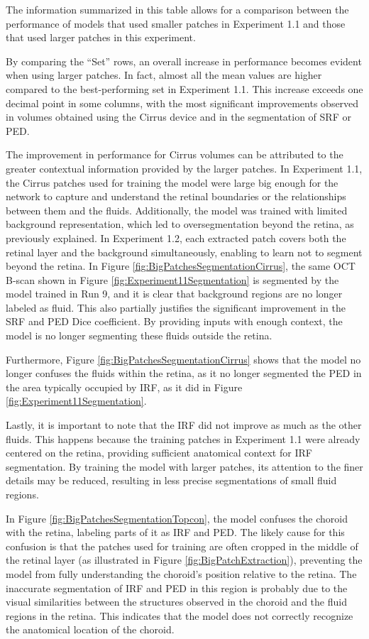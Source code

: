 The information summarized in this table allows for a comparison between the performance of models that used smaller patches in Experiment 1.1 and those that used larger patches in this experiment.
\par
By comparing the ``Set'' rows, an overall increase in performance becomes evident when using larger patches. In fact, almost all the mean values are higher compared to the best-performing set in Experiment 1.1. This increase exceeds one decimal point in some columns, with the most significant improvements observed in volumes obtained using the Cirrus device and in the segmentation of SRF or PED.
\par
The improvement in performance for Cirrus volumes can be attributed to the greater contextual information provided by the larger patches. In Experiment 1.1, the Cirrus patches used for training the model were large big enough for the network to capture and understand the retinal boundaries or the relationships between them and the fluids. Additionally, the model was trained with limited background representation, which led to oversegmentation beyond the retina, as previously explained. In Experiment 1.2, each extracted patch covers both the retinal layer and the background simultaneously, enabling to learn not to segment beyond the retina. In Figure \ref{fig:BigPatchesSegmentationCirrus}, the same OCT B-scan shown in Figure \ref{fig:Experiment11Segmentation} is segmented by the model trained in Run 9, and it is clear that background regions are no longer labeled as fluid. This also partially justifies the significant improvement in the SRF and PED Dice coefficient. By providing inputs with enough context, the model is no longer segmenting these fluids outside the retina. 
\par
Furthermore, Figure \ref{fig:BigPatchesSegmentationCirrus} shows that the model no longer confuses the fluids within the retina, as it no longer segmented the PED in the area typically occupied by IRF, as it did in Figure \ref{fig:Experiment11Segmentation}.
\par
Lastly, it is important to note that the IRF did not improve as much as the other fluids. This happens because the training patches in Experiment 1.1 were already centered on the retina, providing sufficient anatomical context for IRF segmentation. By training the model with larger patches, its attention to the finer details may be reduced, resulting in less precise segmentations of small fluid regions.
\par
In Figure \ref{fig:BigPatchesSegmentationTopcon}, the model confuses the choroid with the retina, labeling parts of it as IRF and PED. The likely cause for this confusion is that the patches used for training are often cropped in the middle of the retinal layer (as illustrated in Figure \ref{fig:BigPatchExtraction}), preventing the model from fully understanding the choroid's position relative to the retina. The inaccurate segmentation of IRF and PED in this region is probably due to the visual similarities between the structures observed in the choroid and the fluid regions in the retina. This indicates that the model does not correctly recognize the anatomical location of the choroid.

